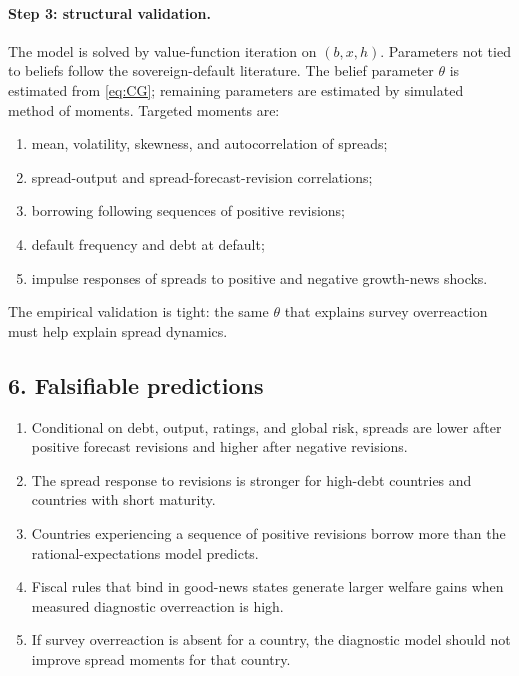 \documentclass[11pt]{article}
\begin{document}
\paragraph{Step 3: structural validation.} The model is solved by value-function iteration on $(b,x,h)$. Parameters not tied to beliefs follow the sovereign-default literature. The belief parameter $\theta$ is estimated from \eqref{eq:CG}; remaining parameters are estimated by simulated method of moments. Targeted moments are:
\begin{enumerate}[label=(\roman*)]
\item mean, volatility, skewness, and autocorrelation of spreads;
\item spread-output and spread-forecast-revision correlations;
\item borrowing following sequences of positive revisions;
\item default frequency and debt at default;
\item impulse responses of spreads to positive and negative growth-news shocks.
\end{enumerate}
The empirical validation is tight: the same $\theta$ that explains survey overreaction must help explain spread dynamics.

\subsection*{6. Falsifiable predictions}
\begin{enumerate}[label=\textbf{P\arabic*.},leftmargin=*]
\item Conditional on debt, output, ratings, and global risk, spreads are lower after positive forecast revisions and higher after negative revisions.
\item The spread response to revisions is stronger for high-debt countries and countries with short maturity.
\item Countries experiencing a sequence of positive revisions borrow more than the rational-expectations model predicts.
\item Fiscal rules that bind in good-news states generate larger welfare gains when measured diagnostic overreaction is high.
\item If survey overreaction is absent for a country, the diagnostic model should not improve spread moments for that country.
\end{enumerate}
\end{document}
